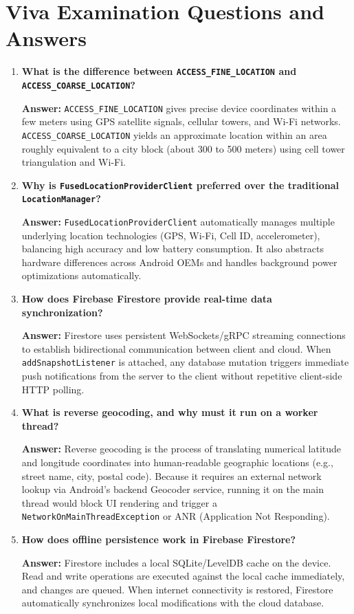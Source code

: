 \documentclass[12pt,a4paper]{article}
\begin{document}
\section*{Viva Examination Questions and Answers}

\begin{enumerate}[label=\textbf{Q\arabic*.},leftmargin=*]
  \item \textbf{What is the difference between \texttt{ACCESS\_FINE\_LOCATION} and \texttt{ACCESS\_COARSE\_LOCATION}?}
  
  \textbf{Answer:} \texttt{ACCESS\_FINE\_LOCATION} gives precise device coordinates within a few meters using GPS satellite signals, cellular towers, and Wi-Fi networks. \texttt{ACCESS\_COARSE\_LOCATION} yields an approximate location within an area roughly equivalent to a city block (about 300 to 500 meters) using cell tower triangulation and Wi-Fi.

  \item \textbf{Why is \texttt{FusedLocationProviderClient} preferred over the traditional \texttt{LocationManager}?}
  
  \textbf{Answer:} \texttt{FusedLocationProviderClient} automatically manages multiple underlying location technologies (GPS, Wi-Fi, Cell ID, accelerometer), balancing high accuracy and low battery consumption. It also abstracts hardware differences across Android OEMs and handles background power optimizations automatically.

  \item \textbf{How does Firebase Firestore provide real-time data synchronization?}
  
  \textbf{Answer:} Firestore uses persistent WebSockets/gRPC streaming connections to establish bidirectional communication between client and cloud. When \texttt{addSnapshotListener} is attached, any database mutation triggers immediate push notifications from the server to the client without repetitive client-side HTTP polling.

  \item \textbf{What is reverse geocoding, and why must it run on a worker thread?}
  
  \textbf{Answer:} Reverse geocoding is the process of translating numerical latitude and longitude coordinates into human-readable geographic locations (e.g., street name, city, postal code). Because it requires an external network lookup via Android's backend Geocoder service, running it on the main thread would block UI rendering and trigger a \texttt{NetworkOnMainThreadException} or ANR (Application Not Responding).

  \item \textbf{How does offline persistence work in Firebase Firestore?}
  
  \textbf{Answer:} Firestore includes a local SQLite/LevelDB cache on the device. Read and write operations are executed against the local cache immediately, and changes are queued. When internet connectivity is restored, Firestore automatically synchronizes local modifications with the cloud database.
\end{enumerate}
\end{document}
